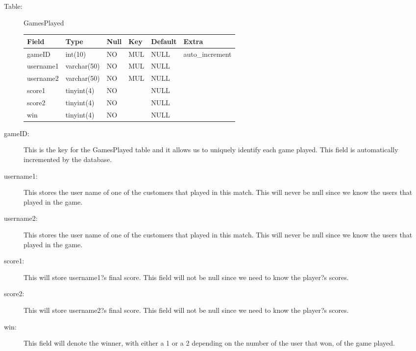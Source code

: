 \begin{description}

\item[Table:] GamesPlayed

\begin{center}
    \begin{tabular}{ | l | l | l | l | l | l|}
    \hline
    Field & Type & Null & Key & Default & Extra \\ \hline \hline
    gameID & int(10) & NO & MUL & NULL & auto\_increment \\ \hline
    username1 & varchar(50) & NO & MUL & NULL &\hspace{1 pc}  \\ \hline
    username2 & varchar(50) & NO & MUL& NULL &\hspace{1 pc}  \\ \hline
    score1 & tinyint(4) & NO &\hspace{1 pc} & NULL &\hspace{1 pc}  \\ \hline
    score2 & tinyint(4) & NO &\hspace{1 pc} & NULL &\hspace{1 pc}   \\\hline
    win & tinyint(4) & NO &\hspace{1 pc} & NULL & \hspace{1 pc} \\
    \hline
    \end{tabular}
\end{center}
\item[gameID:] This is the key for the GamesPlayed table and it allows us to uniquely identify each game played. This field is automatically incremented by the database.
\item[username1:] This stores the user name of one of the customers that played in this match. This will never be null since we know the users that played in the game.
\item[username2:] This stores the user name of one of the customers that played in this match. This will never be null since we know the users that played in the game.
\item[score1:] This will store username1?s final score. This field will not be null since we need to know the player?s scores.
\item[score2:] This will store username2?s final score. This field will not be null since we need to know the player?s scores.
\item[win:] This field will denote the winner, with either a 1 or a 2 depending on the number of the user that won, of the game played.

\end{description}
